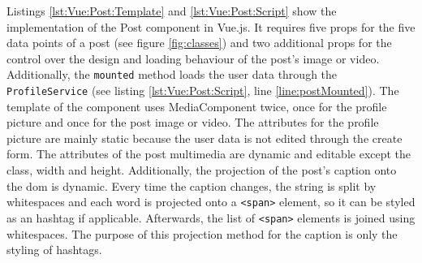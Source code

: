 \documentclass[a4paper, 12pt]{article}
\begin{document}
Listings \ref{lst:Vue:Post:Template} and \ref{lst:Vue:Post:Script} show the implementation of the Post component in Vue.js.
It requires five props for the five data points of a post (see figure \ref{fig:classes}) and two additional props for the control over the design and loading behaviour of the post's image or video.
Additionally, the \verb|mounted| method loads the user data through the \verb|ProfileService| (see listing \ref{lst:Vue:Post:Script}, line \ref{line:postMounted}).
The template of the component uses MediaComponent twice, once for the profile picture and once for the post image or video.
The attributes for the profile picture are mainly static because the user data is not edited through the create form.
The attributes of the post multimedia are dynamic and editable except the class, width and height.
Additionally, the projection of the post's caption onto the \acrshort{dom} is dynamic.
Every time the caption changes, the string is split by whitespaces and each word is projected onto a \verb|<span>| element, so it can be styled as an hashtag if applicable.
Afterwards, the list of \verb|<span>| elements is joined using whitespaces.
The purpose of this projection method for the caption is only the styling of hashtags.
\end{document}
